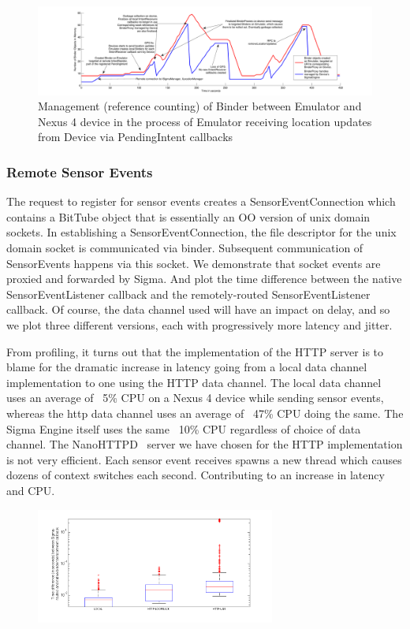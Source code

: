 \documentclass[prodmode]{acmlarge}
\begin{document}
\begin{figure}[h]
\centering
\includegraphics[width=\textwidth]{plots/location_sharing_reference_counting.pdf}
\caption{Management (reference counting) of Binder between Emulator and Nexus 4 device in the process of Emulator receiving location updates from Device via PendingIntent callbacks}
\label{fig:reference_counting}
\end{figure}

\subsubsection{Remote Sensor Events}
The request to register for sensor events creates a SensorEventConnection which contains a BitTube object that is essentially an OO version of unix domain sockets. In establishing a SensorEventConnection, the file descriptor for the unix domain socket is communicated via binder. Subsequent communication of SensorEvents happens via this socket. We demonstrate that socket events are proxied and forwarded by Sigma. And plot the time difference between the native SensorEventListener callback and the remotely-routed SensorEventListener callback. Of course, the data channel used will have an impact on delay, and so we plot three different versions, each with progressively more latency and jitter.

From profiling, it turns out that the implementation of the HTTP server is to blame for the dramatic increase in latency going from a local data channel implementation to one using the HTTP data channel. The local data channel uses an average of ~5\% CPU on a Nexus 4 device while sending sensor events, whereas the http data channel uses an average of ~47\% CPU doing the same. The Sigma Engine itself uses the same ~10\% CPU regardless of choice of data channel. The NanoHTTPD~\cite{NanoHttpd} server we have chosen for the HTTP implementation is not very efficient. Each sensor event receives spawns a new thread which causes dozens of context switches each second. Contributing to an increase in latency and CPU.

\begin{figure}[h]
\centering
\includegraphics[width=0.7\textwidth]{plots/sensorevent_delay.png}
\end{figure}
\end{document}
